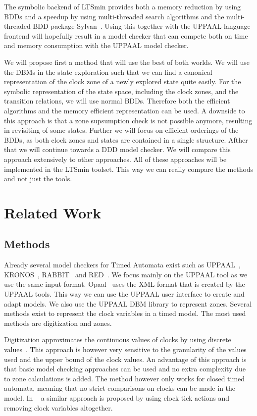 \documentclass[11pt]{article}
\begin{document}
The symbolic backend of LTSmin provides both a memory reduction by using BDDs and a speedup by using multi-threaded search algorithms and the multi-threaded BDD package Sylvan~\cite{sylvan}. Using this together with the UPPAAL language frontend will hopefully result in a model checker that can compete both on time and memory consumption with the UPPAAL model checker.

We will propose first a method that will use the best of both worlds. We will use the DBMs in the state exploration such that we can find a canonical representation of the clock zone of a newly explored state quite easily. For the symbolic representation of the state space, including the clock zones, and the transition relations, we will use normal BDDs. Therefore both the efficient algorithms and the memory efficient representation can be used. A downside to this approach is that a zone supsumption check is not possible anymore, resulting in revisiting of some states. Further we will focus on efficient orderings of the BDDs, as both clock zones and states are contained in a single structure. Afther that we will continue towards a DDD model checker. We will compare this approach extensively to other approaches. All of these approaches will be implemented in the LTSmin toolset. This way we can really compare the methods and not just the tools.

\section{Related Work}
\subsection{Methods}
Already several model checkers for Timed Automata exist such as UPPAAL~\cite{UPPAAL}, KRONOS~\cite{kronos}, RABBIT~\cite{CAV03} and RED~\cite{crds}. We focus mainly on the UPPAAL tool as we use the same input format. Opaal~\cite{opaal} uses the XML format that is created by the UPPAAL tools. This way we can use the UPPAAL user interface to create and adapt models. We also use the UPPAAL DBM library to represent zones. Several methods exist to represent the clock variables in a timed model. The most used methods are digitization and zones. 

Digitization approximates the continuous values of clocks by using discrete values~\cite{CHARME01}. This approach is however very sensitive to the granularity of the values used and the upper bound of the clock values. An advantage of this approach is that basic model checking approaches can be used and no extra complexity due to zone calculations is added. The method however only works for closed timed automata, meaning that no strict comparisons on clocks can be made in the model. In ~\cite{nguyen2012discrete} a similar approach is proposed by using clock tick actions and removing clock variables altogether. 
\end{document}
